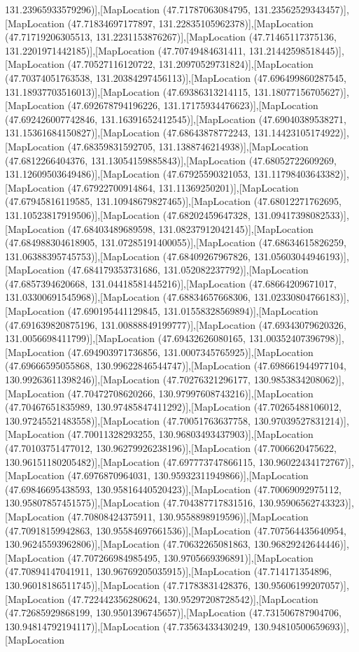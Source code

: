 131.23965933579296)],[MapLocation (47.71787063084795, 131.23562529343457)],[MapLocation (47.71834697177897, 131.22835105962378)],[MapLocation (47.71719206305513, 131.2231153876267)],[MapLocation (47.71465117375136, 131.2201971442185)],[MapLocation (47.70749484631411, 131.21442598518445)],[MapLocation (47.70527116120722, 131.20970529731824)],[MapLocation (47.70374051763538, 131.20384297456113)],[MapLocation (47.696499860287545, 131.18937703516013)],[MapLocation (47.69386313214115, 131.18077156705627)],[MapLocation (47.692678794196226, 131.17175934476623)],[MapLocation (47.692426007742846, 131.16391652412545)],[MapLocation (47.69040389538271, 131.15361684150827)],[MapLocation (47.68643878772243, 131.14423105174922)],[MapLocation (47.68359831592705, 131.1388746214938)],[MapLocation (47.6812266404376, 131.13054159885843)],[MapLocation (47.68052722609269, 131.12609503649486)],[MapLocation (47.67925590321053, 131.11798403643382)],[MapLocation (47.67922700914864, 131.11369250201)],[MapLocation (47.67945816119585, 131.10948679827465)],[MapLocation (47.68012271762695, 131.10523817919506)],[MapLocation (47.68202459647328, 131.09417398082533)],[MapLocation (47.68403489689598, 131.08237912042145)],[MapLocation (47.684988304618905, 131.07285191400055)],[MapLocation (47.68634615826259, 131.06388395745753)],[MapLocation (47.68409267967826, 131.05603044946193)],[MapLocation (47.684179353731686, 131.052082237792)],[MapLocation (47.6857394620668, 131.04418581445216)],[MapLocation (47.68664209671017, 131.03300691545968)],[MapLocation (47.68834657668306, 131.02330804766183)],[MapLocation (47.690195441129845, 131.01558328569894)],[MapLocation (47.691639820875196, 131.00888849199777)],[MapLocation (47.69343079620326, 131.0056698411799)],[MapLocation (47.69432626080165, 131.00352407396798)],[MapLocation (47.694903971736856, 131.0007345765925)],[MapLocation (47.69666595055868, 130.99622846544747)],[MapLocation (47.698661944977104, 130.99263611398246)],[MapLocation (47.70276321296177, 130.9853834208062)],[MapLocation (47.70472708620266, 130.97997608743216)],[MapLocation (47.70467651835989, 130.97485847411292)],[MapLocation (47.70265488106012, 130.97245521483558)],[MapLocation (47.70051763637758, 130.97039527831214)],[MapLocation (47.70011328293255, 130.96803493437903)],[MapLocation (47.70103751477012, 130.96279926238196)],[MapLocation (47.7006620475622, 130.96151180205482)],[MapLocation (47.697773747866115, 130.96022434172767)],[MapLocation (47.6976870964031, 130.95932311949866)],[MapLocation (47.69846695438593, 130.95816440520423)],[MapLocation (47.70069092975112, 130.95807857451575)],[MapLocation (47.704387717831516, 130.95906562743323)],[MapLocation (47.70808424375911, 130.9558898919596)],[MapLocation (47.70918159942863, 130.95584697661536)],[MapLocation (47.707564435640954, 130.96245593962806)],[MapLocation (47.70632265081863, 130.96829242644446)],[MapLocation (47.707266984985495, 130.9705669396891)],[MapLocation (47.70894147041911, 130.96769205035915)],[MapLocation (47.714171354896, 130.96018186511745)],[MapLocation (47.71783831428376, 130.95606199207057)],[MapLocation (47.722442356280624, 130.95297208728542)],[MapLocation (47.72685929868199, 130.9501396745657)],[MapLocation (47.731506787904706, 130.94814792194117)],[MapLocation (47.73563433430249, 130.94810500659693)],[MapLocation 